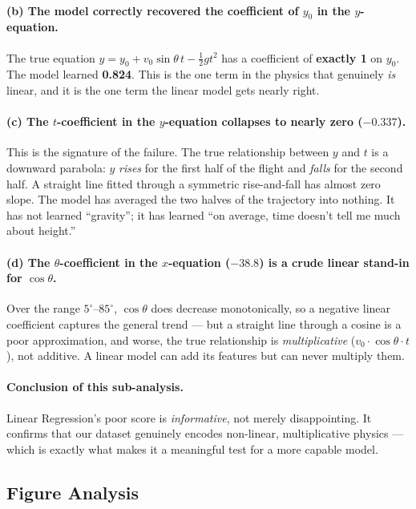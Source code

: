 \documentclass[11pt,a4paper]{article}
\newcommand{\vzero}{v_{0}}
\newcommand{\yzero}{y_{0}}
\begin{document}
\paragraph{(b) The model correctly recovered the coefficient of $\yzero$ in the $y$-equation.}
The true equation $y=\yzero+\vzero\sin\theta\,t-\tfrac{1}{2}gt^{2}$ has a coefficient of
\textbf{exactly 1} on $\yzero$. The model learned \textbf{0.824}. This is the one term in the
physics that genuinely \emph{is} linear, and it is the one term the linear model gets nearly right.

\paragraph{(c) The $t$-coefficient in the $y$-equation collapses to nearly zero ($-0.337$).}
This is the signature of the failure. The true relationship between $y$ and $t$ is a downward
parabola: $y$ \emph{rises} for the first half of the flight and \emph{falls} for the second half. A
straight line fitted through a symmetric rise-and-fall has almost zero slope. The model has averaged
the two halves of the trajectory into nothing. It has not learned ``gravity''; it has learned ``on
average, time doesn't tell me much about height.''

\paragraph{(d) The $\theta$-coefficient in the $x$-equation ($-38.8$) is a crude linear stand-in for $\cos\theta$.}
Over the range $5^\circ$--$85^\circ$, $\cos\theta$ does decrease monotonically, so a negative linear
coefficient captures the general trend --- but a straight line through a cosine is a poor
approximation, and worse, the true relationship is \emph{multiplicative}
($\vzero\cdot\cos\theta\cdot t$), not additive. A linear model can add its features but can never
multiply them.

\paragraph{Conclusion of this sub-analysis.}
Linear Regression's poor score is \emph{informative}, not merely disappointing. It confirms that our
dataset genuinely encodes non-linear, multiplicative physics --- which is exactly what makes it a
meaningful test for a more capable model.

\subsection{Figure Analysis}\label{sec:figures}
\end{document}
